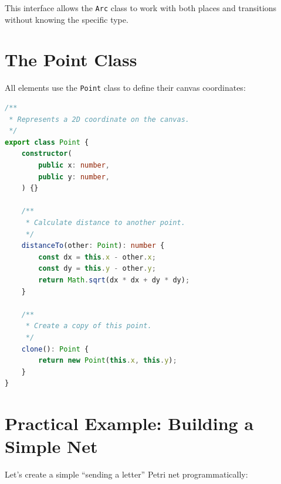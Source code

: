 This interface allows the \texttt{Arc} class to work with both places and transitions without knowing the specific type.

\section{The Point Class}
\label{sec:point-class}

All elements use the \texttt{Point} class to define their canvas coordinates:

\begin{lstlisting}[language=TypeScript, caption={Point class (src/app/tr-classes/petri-net/point.ts)}]
/**
 * Represents a 2D coordinate on the canvas.
 */
export class Point {
    constructor(
        public x: number,
        public y: number,
    ) {}

    /**
     * Calculate distance to another point.
     */
    distanceTo(other: Point): number {
        const dx = this.x - other.x;
        const dy = this.y - other.y;
        return Math.sqrt(dx * dx + dy * dy);
    }

    /**
     * Create a copy of this point.
     */
    clone(): Point {
        return new Point(this.x, this.y);
    }
}
\end{lstlisting}

\section{Practical Example: Building a Simple Net}
\label{sec:elements-example}

Let's create a simple ``sending a letter'' Petri net programmatically:


